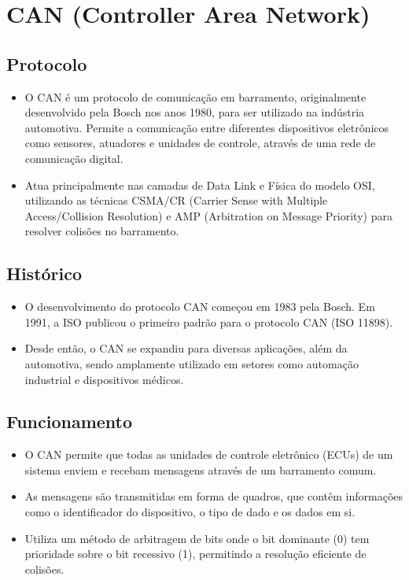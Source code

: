 \documentclass[a4paper,11pt]{article} %
\begin{document}
\section{CAN (Controller Area Network)}

\subsection{Protocolo}
\begin{itemize}
    \item O CAN é um protocolo de comunicação em barramento, originalmente desenvolvido pela Bosch nos anos 1980, para ser utilizado na indústria automotiva. Permite a comunicação entre diferentes dispositivos eletrônicos como sensores, atuadores e unidades de controle, através de uma rede de comunicação digital.
    \item Atua principalmente nas camadas de Data Link e Física do modelo OSI, utilizando as técnicas CSMA/CR (Carrier Sense with Multiple Access/Collision Resolution) e AMP (Arbitration on Message Priority) para resolver colisões no barramento.
\end{itemize}

\subsection{Histórico}
\begin{itemize}
    \item O desenvolvimento do protocolo CAN começou em 1983 pela Bosch. Em 1991, a ISO publicou o primeiro padrão para o protocolo CAN (ISO 11898).
    \item Desde então, o CAN se expandiu para diversas aplicações, além da automotiva, sendo amplamente utilizado em setores como automação industrial e dispositivos médicos.
\end{itemize}

\subsection{Funcionamento}
\begin{itemize}
    \item O CAN permite que todas as unidades de controle eletrônico (ECUs) de um sistema enviem e recebam mensagens através de um barramento comum.
    \item As mensagens são transmitidas em forma de quadros, que contêm informações como o identificador do dispositivo, o tipo de dado e os dados em si.
    \item Utiliza um método de arbitragem de bits onde o bit dominante (0) tem prioridade sobre o bit recessivo (1), permitindo a resolução eficiente de colisões.
\end{itemize}
\end{document}
